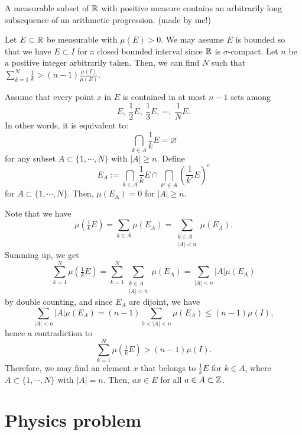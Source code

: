 \documentclass[a4paper]{article}
\begin{document}
\clearpage
\begin{prb}
A measurable subset of $\mathbb{R}$ with positive measure contains an arbitrarily long subsequence of an arithmetic progression. (made by me!)
\end{prb}
\begin{sol}
Let $E\subset\mathbb{R}$ be measurable with $\mu(E)>0$. We may assume $E$ is bounded so that we have $E\subset I$ for a closed bounded interval since $\mathbb{R}$ is $\sigma$-compact.
Let $n$ be a positive integer arbitrarily taken. Then, we can find $N$ such that $\sum_{k=1}^N\frac1k>(n-1)\frac{\mu(I)}{\mu(E)}$.

Assume that every point $x$ in $E$ is contained in at most $n-1$ sets among
\[E,\ \frac12E,\ \frac13E,\ \cdots,\ \frac1NE.\]
In other words, it is equivalent to:
\[\bigcap_{k\in A}\frac1kE=\varnothing\]
for any subset $A\subset\{1,\cdots,N\}$ with $|A|\ge n$.
Define
\[E_A:=\bigcap_{k\in A}\frac1kE\cap\bigcap_{k'\in A}\left(\frac1{k'}E\right)^c\]
for $A\subset\{1,\cdots,N\}$.
Then, $\mu(E_A)=0$ for $|A|\ge n$.

Note that we have
\[\mu(\tfrac1kE)=\sum_{k\in A}\mu(E_A)=\sum_{\substack{k\in A\\|A|<n}}\mu(E_A).\]
Summing up, we get
\[\sum_{k=1}^N\mu(\tfrac1kE)=\sum_{k=1}^N\sum_{\substack{k\in A\\|A|<n}}\mu(E_A)=\sum_{|A|<n}|A|\mu(E_A)\]
by double counting,
and since $E_A$ are dijoint, we have
\[\sum_{|A|<n}|A|\mu(E_A)=(n-1)\sum_{0<|A|<n}\mu(E_A)\le(n-1)\mu(I),\]
hence a contradiction to
\[\sum_{k=1}^N\mu(\tfrac1kE)>(n-1)\mu(I).\]
Therefore, we may find an element $x$ that belongs to $\frac1kE$ for $k\in A$, where $A\subset\{1,\cdots,N\}$ with $|A|=n$.
Then, $ax\in E$ for all $a\in A\subset\mathbb{Z}$.
\end{sol}




\section{Physics problem}
\end{document}

